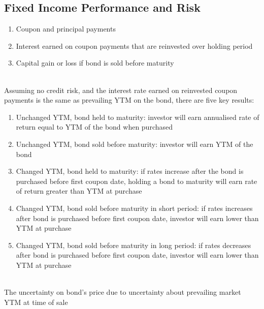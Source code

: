 \subsection{Fixed Income Performance and Risk}

\begin{remark} 
\begin{enumerate}[label=\roman*.]
\setlength{\itemsep}{0pt}
\item Coupon and principal payments
\item Interest earned on coupon payments that are reinvested over holding period
\item Capital gain or loss if bond is sold before maturity
\end{enumerate}
\end{remark}

\begin{remark} \\
Assuming no credit risk, and the interest rate earned on reinvested coupon payments is the same as prevailing YTM on the bond, there are five key results:
\begin{enumerate}[label=\roman*.]
\setlength{\itemsep}{0pt}
\item Unchanged YTM, bond held to maturity: investor will earn annualised rate of return equal to YTM of the bond when purchased
\item Unchanged YTM, bond sold before maturity: investor will earn YTM of the bond
\item Changed YTM, bond held to maturity: if rates increase after the bond is purchased before first coupon date, holding a bond to maturity will earn rate of return greater than YTM at purchase
\item Changed YTM, bond sold before maturity in short period: if rates increases after bond is purchased before first coupon date, investor will earn lower than YTM at purchase
\item Changed YTM, bond sold before maturity in long period: if rates decreases after bond is purchased before first coupon date, investor will earn lower than YTM at purchase
\end{enumerate}
\end{remark}

\begin{definition} \\
The uncertainty on bond's price due to uncertainty about prevailing market YTM at time of sale
\end{definition}

